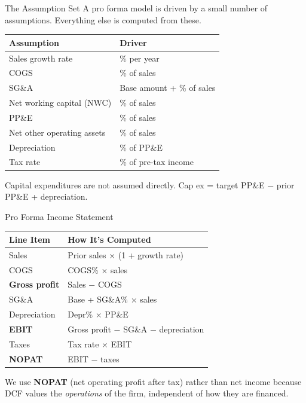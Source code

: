 \documentclass[aspectratio=169]{beamer}
\begin{document}
\begin{frame}{The Assumption Set}
A pro forma model is driven by a small number of assumptions.  Everything else is computed from these.
\vspace{0.2cm}
\begin{center}
\small
\begin{tabular}{@{} l l @{}}
\toprule
\textbf{Assumption} & \textbf{Driver} \\
\midrule
Sales growth rate & \% per year \\
COGS & \% of sales \\
SG\&A & Base amount + \% of sales \\
Net working capital (NWC) & \% of sales \\
PP\&E & \% of sales \\
Net other operating assets & \% of sales \\
Depreciation & \% of PP\&E \\
Tax rate & \% of pre-tax income \\
\bottomrule
\end{tabular}
\end{center}
\vspace{0.2cm}
Capital expenditures are not assumed directly.  \alert{Cap ex = target PP\&E $-$ prior PP\&E + depreciation}.
\end{frame}

\begin{frame}{Pro Forma Income Statement}
\begin{center}
\small
\begin{tabular}{@{} l l @{}}
\toprule
\textbf{Line Item} & \textbf{How It's Computed} \\
\midrule
Sales & Prior sales $\times$ (1 + growth rate) \\
COGS & COGS\% $\times$ sales \\
\textbf{Gross profit} & Sales $-$ COGS \\
SG\&A & Base + SG\&A\% $\times$ sales \\
Depreciation & Depr\% $\times$ PP\&E \\
\textbf{EBIT} & Gross profit $-$ SG\&A $-$ depreciation \\
Taxes & Tax rate $\times$ EBIT \\
\textbf{NOPAT} & EBIT $-$ taxes \\
\bottomrule
\end{tabular}
\end{center}
\vspace{0.3cm}
We use \textbf{NOPAT} (net operating profit after tax) rather than net income because DCF values the \textit{operations} of the firm, independent of how they are financed.
\end{frame}
\end{document}
